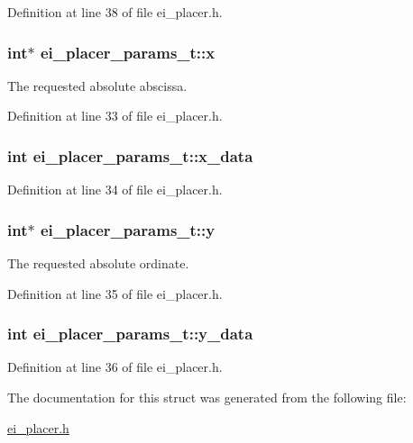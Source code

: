 Definition at line 38 of file ei\-\_\-placer.\-h.

\hypertarget{structei__placer__params__t_ae8562a49f17673cd02409d34fdc81154}{
\subsubsection[{x}]{\setlength{\rightskip}{0pt plus 5cm}int$\ast$ ei\-\_\-placer\-\_\-params\-\_\-t\-::x}}\label{structei__placer__params__t_ae8562a49f17673cd02409d34fdc81154}


The requested absolute abscissa. 



Definition at line 33 of file ei\-\_\-placer.\-h.

\hypertarget{structei__placer__params__t_ae6078f805f079c2ac6e54ecfbe321c50}{
\subsubsection[{x\-\_\-data}]{\setlength{\rightskip}{0pt plus 5cm}int ei\-\_\-placer\-\_\-params\-\_\-t\-::x\-\_\-data}}\label{structei__placer__params__t_ae6078f805f079c2ac6e54ecfbe321c50}


Definition at line 34 of file ei\-\_\-placer.\-h.

\hypertarget{structei__placer__params__t_a1a59b5414bc00a277b71d84adab2ceae}{
\subsubsection[{y}]{\setlength{\rightskip}{0pt plus 5cm}int$\ast$ ei\-\_\-placer\-\_\-params\-\_\-t\-::y}}\label{structei__placer__params__t_a1a59b5414bc00a277b71d84adab2ceae}


The requested absolute ordinate. 



Definition at line 35 of file ei\-\_\-placer.\-h.

\hypertarget{structei__placer__params__t_afa297c58c25de969e3aaf5c01456b04f}{
\subsubsection[{y\-\_\-data}]{\setlength{\rightskip}{0pt plus 5cm}int ei\-\_\-placer\-\_\-params\-\_\-t\-::y\-\_\-data}}\label{structei__placer__params__t_afa297c58c25de969e3aaf5c01456b04f}


Definition at line 36 of file ei\-\_\-placer.\-h.



The documentation for this struct was generated from the following file\-:\begin{DoxyCompactItemize}
\item 
\hyperlink{ei__placer_8h}{ei\-\_\-placer.\-h}\end{DoxyCompactItemize}
